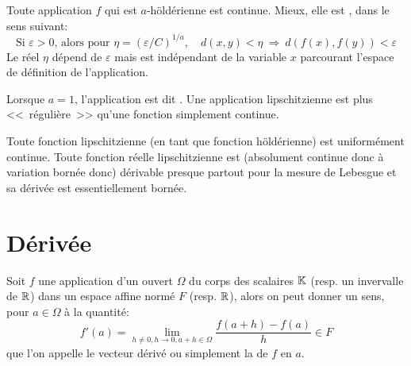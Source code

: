 \ifVersionDuDocEstVincent\medskip\fi
\begin{theoreme}
Toute application $f$ qui est $a$-höldérienne est continue. Mieux, elle est
, dans le sens suivant:
\begin{equation}
\text{Si } \varepsilon>0\text{, alors pour } \eta = \left( \varepsilon / C \right)^{1 / a},\quad d\left( x, y \right) < \eta  \ \Rightarrow\  d\left( f(x), f(y) \right) < \varepsilon
\end{equation}
Le réel $\eta$ dépend de $\varepsilon$ mais est indépendant de la variable $x$
parcourant l'espace de définition de l'application.
\end{theoreme}
\begin{definition}
Lorsque $a = 1$, l'application est dit .
Une application lipschitzienne est plus <<~régulière~>> qu'une fonction
simplement continue.
\end{definition}
\ifVersionDuDocEstVincent\medskip\fi
Toute fonction lipschitzienne (en tant que fonction höldérienne) est uniformément continue.
\ifVersionDuDocEstVincent\medskip\fi
Toute fonction réelle lipschitzienne est (absolument continue donc à variation bornée donc)
dérivable presque partout pour la mesure de Lebesgue et sa dérivée est essentiellement bornée.
\ifVersionDuDocEstVincent\medskip\fi
\section{Dérivée}
\ifVersionDuDocEstVincent\medskip\fi
\begin{definition}
Soit $f$ une application d'un ouvert $\Omega$ du corps des scalaires $\mathbb K$ (resp. un invervalle
de $\mathbb R$) dans un espace affine normé $F$ (resp. $\mathbb R$), alors on peut donner un sens,
pour $a\in\Omega$ à la quantité:
\begin{equation}
f'(a)=\lim_{h\ne0, h\to0, a+h\in\Omega} \dfrac{f(a+h)-f(a)}h \in F
\end{equation}
que l'on appelle le vecteur dérivé ou simplement la  de
$f$ en $a$.
\end{definition}

